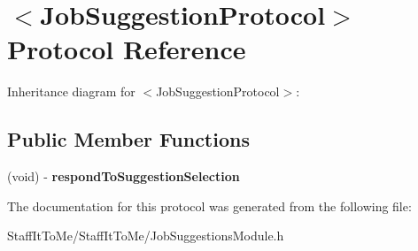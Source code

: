 \hypertarget{protocol_job_suggestion_protocol-p}{
\section{$<$\-Job\-Suggestion\-Protocol$>$ \-Protocol \-Reference}
\label{protocol_job_suggestion_protocol-p}
}


\-Inheritance diagram for $<$\-Job\-Suggestion\-Protocol$>$\-:
\subsection*{\-Public \-Member \-Functions}
\begin{DoxyCompactItemize}
\item 
\hypertarget{protocol_job_suggestion_protocol-p_afaef0d9226ea09d59318a52dc9307ab7}{
(void) -\/ {\bfseries respond\-To\-Suggestion\-Selection}}
\label{protocol_job_suggestion_protocol-p_afaef0d9226ea09d59318a52dc9307ab7}

\end{DoxyCompactItemize}


\-The documentation for this protocol was generated from the following file\-:\begin{DoxyCompactItemize}
\item 
\-Staff\-It\-To\-Me/\-Staff\-It\-To\-Me/\-Job\-Suggestions\-Module.\-h\end{DoxyCompactItemize}
